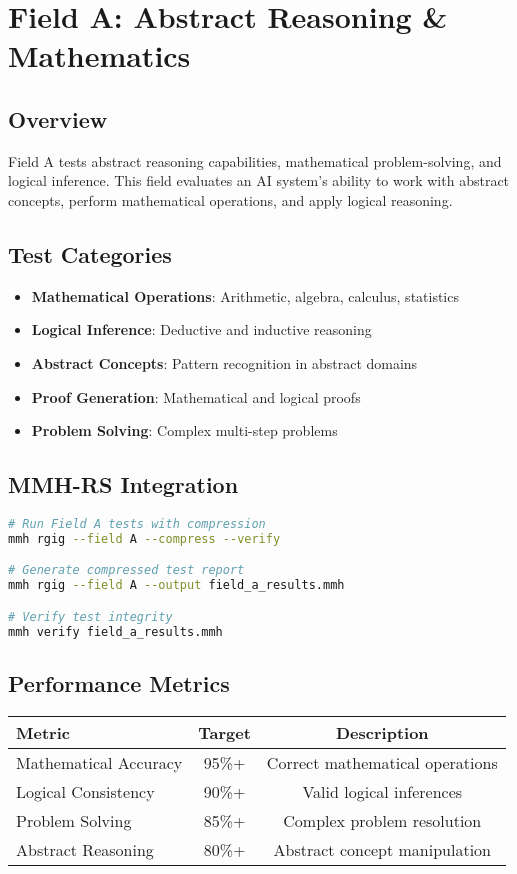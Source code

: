 \documentclass[12pt,a4paper]{article}
\begin{document}
\newpage

\section{Field A: Abstract Reasoning \& Mathematics}

\subsection{Overview}
Field A tests abstract reasoning capabilities, mathematical problem-solving, and logical inference. This field evaluates an AI system's ability to work with abstract concepts, perform mathematical operations, and apply logical reasoning.

\subsection{Test Categories}
\begin{itemize}
    \item \textbf{Mathematical Operations}: Arithmetic, algebra, calculus, statistics
    \item \textbf{Logical Inference}: Deductive and inductive reasoning
    \item \textbf{Abstract Concepts}: Pattern recognition in abstract domains
    \item \textbf{Proof Generation}: Mathematical and logical proofs
    \item \textbf{Problem Solving}: Complex multi-step problems
\end{itemize}

\subsection{MMH-RS Integration}
\begin{lstlisting}[language=bash, caption=Field A Testing with MMH-RS]
# Run Field A tests with compression
mmh rgig --field A --compress --verify

# Generate compressed test report
mmh rgig --field A --output field_a_results.mmh

# Verify test integrity
mmh verify field_a_results.mmh
\end{lstlisting}

\subsection{Performance Metrics}
\begin{center}
\begin{tabular}{|l|c|c|}
\hline
\textbf{Metric} & \textbf{Target} & \textbf{Description} \\
\hline
Mathematical Accuracy & 95\%+ & Correct mathematical operations \\
Logical Consistency & 90\%+ & Valid logical inferences \\
Problem Solving & 85\%+ & Complex problem resolution \\
Abstract Reasoning & 80\%+ & Abstract concept manipulation \\
\hline
\end{tabular}
\end{center}
\end{document}
